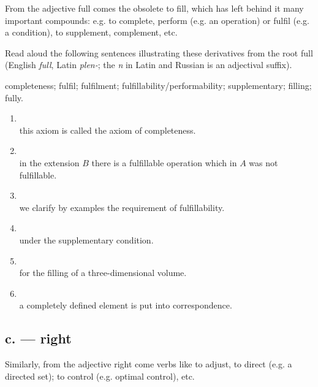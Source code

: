 From the adjective  full comes the obsolete  to fill, which has left behind it many important compounds: e.g.  to complete, perform (e.g. an operation) or fulfil (e.g. a condition),  to supplement, complement, etc.

\begin{keybox}[Exercise 5.8]
Read aloud the following sentences illustrating these derivatives from the root  full (English \emph{full}, Latin \emph{plen-}; the \emph{n} in Latin and Russian is an adjectival suffix).
\end{keybox}

\noindent{} completeness;  fulfil;  fulfilment;  fulfillability/performability;  supplementary;  filling;  fully.

\begin{enumerate}[label=\arabic*)]
\item {}\\
      this axiom is called the axiom of completeness.
\item {}\\
      in the extension $B$ there is a fulfillable operation which in $A$ was not fulfillable.
\item {}\\
      we clarify by examples the requirement of fulfillability.
\item {}\\
      under the supplementary condition.
\item {}\\
      for the filling of a three-dimensional volume.
\item {}\\
      a completely defined element is put into correspondence.
\end{enumerate}

\subsection*{c.  --- right}

Similarly, from the adjective  right come verbs like  to adjust,  to direct (e.g.  a directed set);  to control (e.g.  optimal control), etc.

